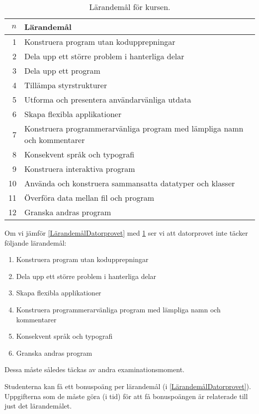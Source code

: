 \begin{table}[p]
  \caption{Lärandemål för kursen.}
  \label{LarandemalKursen}
  \begin{tabular}{rp{}}
    \toprule
    \(n\) & Lärandemål\\
    \midrule
    1 & Konstruera program utan kodupprepningar\\
    2 & Dela upp ett större problem i hanterliga delar\\
    3 & Dela upp ett program\\
    4 & Tillämpa styrstrukturer\\
    5 & Utforma och presentera användarvänliga utdata\\
    6 & Skapa flexibla applikationer\\
    7 & Konstruera programmerarvänliga program med lämpliga namn och kommentarer\\
    8 & Konsekvent språk och typografi\\
    9 & Konstruera interaktiva program\\
    10 & Använda och konstruera sammansatta datatyper och klasser\\
    11 & Överföra data mellan fil och program\\
    12 & Granska andras program\\
    \bottomrule
  \end{tabular}
\end{table}

Om vi jämför \cref{LärandemålDatorprovet} med \cref{LarandemalKursen} ser vi 
att datorprovet inte täcker följande lärandemål:
\begin{enumerate}
\setcounter{enumi}{0}
\item Konstruera program utan kodupprepningar \label{item:reuse}
\item Dela upp ett större problem i hanterliga delar \label{item:divide}
\setcounter{enumi}{5}
\item Skapa flexibla applikationer \label{item:flexible}
\item Konstruera programmerarvänliga program med lämpliga namn och kommentarer \label{item:readable}
\item Konsekvent språk och typografi \label{item:consistency}
\setcounter{enumi}{11}
\item Granska andras program \label{item:review}
\end{enumerate}
Dessa måste således täckas av andra examinationsmoment.

Studenterna kan få ett bonuspoäng per lärandemål (i 
\cref{LärandemålDatorprovet}).
Uppgifterna som de måste göra (i tid) för att få bonuspoängen är relaterade 
till just det lärandemålet.

